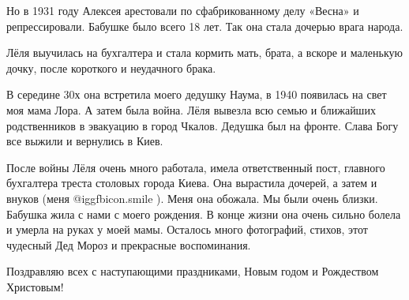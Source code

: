 \raggedcolumns
\begin{multicols}{4} %
\setlength{\parindent}{0pt}









\end{multicols} %

\zzrule

Но в 1931 году Алексея арестовали по сфабрикованному делу «Весна» и
репрессировали. Бабушке было всего 18 лет. Так она стала дочерью врага народа. 

Лёля выучилась на бухгалтера и стала кормить мать, брата, а вскоре и маленькую
дочку, после короткого и неудачного брака.

В середине 30х она встретила моего дедушку Наума, в 1940 появилась на свет моя
мама Лора. А затем была война. Лёля вывезла всю семью и ближайших родственников
в эвакуацию в город Чкалов. Дедушка был на фронте. Слава Богу все выжили и
вернулись в Киев.

После войны Лёля очень много работала, имела ответственный пост, главного
бухгалтера треста столовых города Киева. Она вырастила дочерей, а затем и
внуков (меня  @igg{fbicon.smile} ). Меня она обожала. Мы были очень близки. Бабушка жила с нами с
моего рождения. В конце жизни она очень сильно болела и умерла на руках у моей
мамы. Осталось много фотографий, стихов, этот чудесный Дед Мороз и прекрасные
воспоминания.

Поздравляю всех с наступающими праздниками, Новым годом и Рождеством Христовым!
